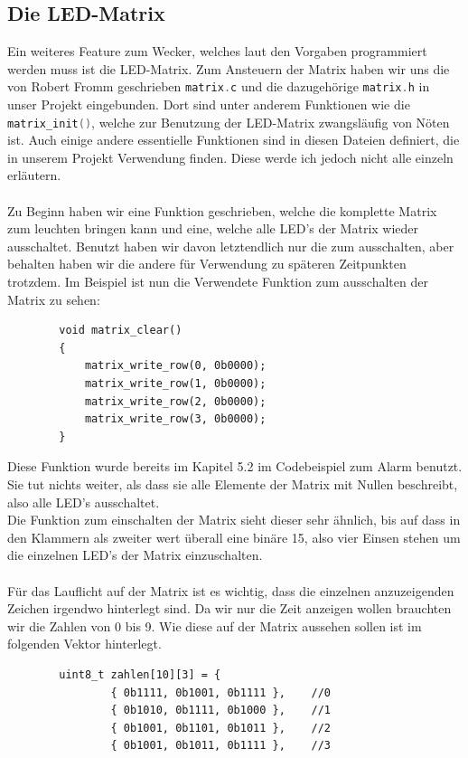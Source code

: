 \documentclass[openright,twoside,11pt,a4paper]{scrartcl}
\begin{document}
\begin{flushleft}
	 	\section{Die LED-Matrix}
	 	Ein weiteres Feature zum Wecker, welches laut den Vorgaben programmiert werden muss ist die LED-Matrix. Zum Ansteuern der Matrix haben wir uns die von Robert Fromm geschrieben \lstinline[language=c++]|matrix.c| und die dazugehörige \lstinline[language=c++]|matrix.h| in unser Projekt eingebunden. Dort sind unter anderem Funktionen wie die \lstinline[language=c++]|matrix_init()|, welche zur Benutzung der LED-Matrix zwangsläufig von Nöten ist. Auch einige andere essentielle Funktionen sind in diesen Dateien definiert, die in unserem Projekt Verwendung finden. Diese werde ich jedoch nicht alle einzeln erläutern.\\
	 	\ \\
	 	Zu Beginn haben wir eine Funktion geschrieben, welche die komplette Matrix zum leuchten bringen kann und eine, welche alle LED's der Matrix wieder ausschaltet. Benutzt haben wir davon letztendlich nur die zum ausschalten, aber behalten haben wir die andere für Verwendung zu späteren Zeitpunkten trotzdem. Im Beispiel ist nun die Verwendete Funktion zum ausschalten der Matrix zu sehen:
	 	\begin{lstlisting}
	 	void matrix_clear()
	 	{
		 	matrix_write_row(0, 0b0000);
		 	matrix_write_row(1, 0b0000);
		 	matrix_write_row(2, 0b0000);
		 	matrix_write_row(3, 0b0000);
	 	}
	 	\end{lstlisting}
	 	Diese Funktion wurde bereits im Kapitel 5.2 im Codebeispiel zum Alarm benutzt. Sie tut nichts weiter, als dass sie alle Elemente der Matrix mit Nullen beschreibt, also alle LED's ausschaltet.\\
	 	Die Funktion zum einschalten der Matrix sieht dieser sehr ähnlich, bis auf dass in den Klammern als zweiter wert überall eine binäre 15, also vier Einsen stehen um die einzelnen LED's der Matrix einzuschalten. \\
	 	\ \\
	 	Für das Lauflicht auf der Matrix ist es wichtig, dass die einzelnen anzuzeigenden Zeichen irgendwo hinterlegt sind. Da wir nur die Zeit anzeigen wollen brauchten wir die Zahlen von 0 bis 9. Wie diese auf der Matrix aussehen sollen ist im folgenden Vektor hinterlegt.
	 	\begin{lstlisting}
	 	uint8_t zahlen[10][3] = {
	 			{ 0b1111, 0b1001, 0b1111 },    //0
			 	{ 0b1010, 0b1111, 0b1000 },    //1
			 	{ 0b1001, 0b1101, 0b1011 },    //2
			 	{ 0b1001, 0b1011, 0b1111 },    //3

\end{lstlisting}
\end{flushleft}
\end{document}
